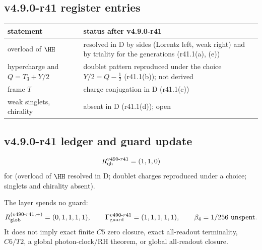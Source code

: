 \subsection*{v4.9.0-r41 register entries}
\label{subsec:v490-r41-register}

\begin{center}
\small
\begin{tabular}{@{}>{\raggedright\arraybackslash}p{}>{\raggedright\arraybackslash}p{}@{}}
\toprule
statement & status after v4.9.0-r41\\
\midrule
overload of \(\HH\) & resolved in D by sides (Lorentz left, weak right) and by triality for the generations (r41.1(a), (e))\\
hypercharge and \(Q=T_3+Y/2\) & doublet pattern reproduced under the choice \(Y/2=Q-\tfrac12\) (r41.1(b)); not derived\\
frame \(T\) & charge conjugation in D (r41.1(c))\\
weak singlets, chirality & absent in D (r41.1(d)); open\\
\bottomrule
\end{tabular}
\end{center}

\subsection*{v4.9.0-r41 ledger and guard update}
\label{subsec:v490-r41-ledger-guard}

\[
R_{\rm qh}^{v490\text{-}r41}=(1,1,0)
\]
for (overload of \(\HH\) resolved in D; doublet charges reproduced under a choice; singlets and chirality absent).

The layer spends no guard:
\[
R_{\rm glob}^{(v490\text{-}r41,+)}=(0,1,1,1,1),
\qquad
\Gamma_{\rm guard}^{v490\text{-}r41}=(1,1,1,1,1),
\qquad
\beta_4=1/256\ \text{unspent}.
\]
It does not imply exact finite \(C5\) zero closure, exact all-readout terminality,
\(C6/T2\), a global photon-clock/RH theorem, or global all-readout closure.
